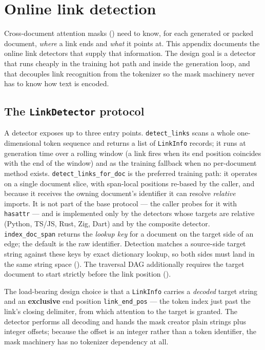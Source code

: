 \section{Online link detection}
\label{app:linkdet}

Cross-document attention masks () need to know, for each
generated or packed document, \emph{where} a link ends and \emph{what} it points
at. This appendix documents the online link detectors that supply that
information. The design goal is a detector that runs cheaply in the training hot
path and inside the generation loop, and that decouples link recognition from the
tokenizer so the mask machinery never has to know how text is encoded.

\subsection{The \texttt{LinkDetector} protocol}

A detector exposes up to three entry points. \texttt{detect\_links} scans a whole
one-dimensional token sequence and returns a list of \texttt{LinkInfo} records; it
runs at generation time over a rolling window (a link fires when its end position
coincides with the end of the window) and as the training fallback when no
per-document method exists. \texttt{detect\_links\_for\_doc} is the preferred
training path: it operates on a single document slice, with span-local positions
re-based by the caller, and because it receives the owning document's identifier it
can resolve \emph{relative} imports. It is not part of the base protocol --- the
caller probes for it with \texttt{hasattr} --- and is implemented only by the
detectors whose targets are relative (Python, TS/JS, Rust, Zig, Dart) and by the
composite detector. \texttt{index\_doc\_span} returns the \emph{lookup key} for a
document on the target side of an edge; the default is the raw identifier.
Detection matches a source-side target string against these keys by exact
dictionary lookup, so both sides must land in the same string space
(). The traversal DAG additionally requires the target
document to start strictly before the link position ().

The load-bearing design choice is that a \texttt{LinkInfo} carries a
\emph{decoded} target string and an \textbf{exclusive} end position
\texttt{link\_end\_pos} --- the token index just past the link's closing delimiter,
from which attention to the target is granted. The detector performs all decoding
and hands the mask creator plain strings plus integer offsets; because the offset
is an integer rather than a token identifier, the mask machinery has no tokenizer
dependency at all.

